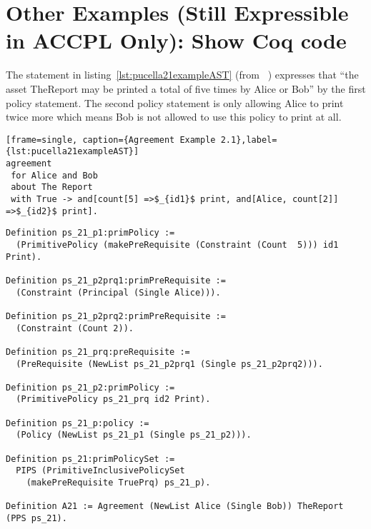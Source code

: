 


\section{Other Examples (Still Expressible in ACCPL Only): Show Coq code}

The statement in listing~\ref{lst:pucella21exampleAST} (from ~\cite{pucella2006}) expresses that ``the asset TheReport may be printed a total of five times by Alice or Bob'' by the first policy statement. The second policy statement is only allowing Alice to print twice more which means Bob is not allowed to use this policy to print at all.

\lstset{language=Pucella2006}
\begin{minipage}[c]{0.95\textwidth}
\begin{lstlisting}[mathescape][frame=single, caption={Agreement Example 2.1},label={lst:pucella21exampleAST}]
agreement
 for Alice and Bob 
 about The Report 
 with True -> and[count[5] =>$_{id1}$ print, and[Alice, count[2]] =>$_{id2}$ print].
\end{lstlisting}
\end{minipage} 

\begin{minipage}[c]{0.95\textwidth}
\begin{lstlisting}
Definition ps_21_p1:primPolicy := 
  (PrimitivePolicy (makePreRequisite (Constraint (Count  5))) id1 Print).

Definition ps_21_p2prq1:primPreRequisite := 
  (Constraint (Principal (Single Alice))).

Definition ps_21_p2prq2:primPreRequisite := 
  (Constraint (Count 2)).

Definition ps_21_prq:preRequisite := 
  (PreRequisite (NewList ps_21_p2prq1 (Single ps_21_p2prq2))).

Definition ps_21_p2:primPolicy := 
  (PrimitivePolicy ps_21_prq id2 Print).

Definition ps_21_p:policy := 
  (Policy (NewList ps_21_p1 (Single ps_21_p2))).

Definition ps_21:primPolicySet :=
  PIPS (PrimitiveInclusivePolicySet
    (makePreRequisite TruePrq) ps_21_p).

Definition A21 := Agreement (NewList Alice (Single Bob)) TheReport (PPS ps_21).
\end{lstlisting}
\end{minipage} 

